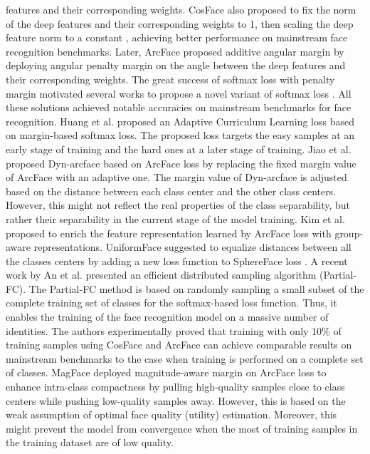 \documentclass[letterpaper, 10 pt, conference]{ieeeconf}  \usepackage{times}
\begin{document}
features and their corresponding weights. CosFace also proposed to fix the norm of the deep features and their corresponding weights to 1, then scaling the deep feature norm to a constant , achieving better performance on mainstream face recognition benchmarks. Later, ArcFace \cite{deng2019arcface}  proposed additive angular margin by deploying angular penalty margin on the angle between the deep features and their corresponding weights. The great success of softmax loss with penalty margin motivated several works to propose a novel variant of softmax loss \cite{dynarc,adaptiveface,uniformface,groupface,cricleloss,curricularface,magface,an2020partical_fc}. All these solutions achieved notable accuracies on mainstream benchmarks \cite{LFWTech,DBLP:conf/wacv/SenguptaCCPCJ16,DBLP:conf/cvpr/WhitelamTBMAMKJ17, DBLP:conf/icb/MazeADKMO0NACG18} for face recognition. 
Huang et al. \cite{curricularface} proposed an Adaptive Curriculum Learning loss based on margin-based softmax loss. The proposed loss targets the easy samples at an early stage of training and the hard ones at a later stage of training. Jiao et al. \cite{dynarc} proposed Dyn-arcface based on ArcFace loss \cite{deng2019arcface} by replacing the fixed margin value of ArcFace with an adaptive one. The margin value of Dyn-arcface is adjusted based on the distance between each class center and the other class centers. However, this might not reflect the real properties of the class separability, but rather their separability in the current stage of the model training.
Kim et al. \cite{groupface} proposed to enrich the feature representation learned by ArcFace loss with group-aware representations. UniformFace \cite{uniformface} suggested to equalize distances between all the classes centers by adding a new loss function to SphereFace loss \cite{DBLP:conf/cvpr/LiuWYLRS17}. A recent work by An et al. \cite{an2020partical_fc} presented an efficient distributed sampling algorithm (Partial-FC). 
The Partial-FC method is based on randomly sampling a small subset of the complete training set of classes for the softmax-based
loss function. Thus, it enables the training of the face recognition model on a massive number of identities. 
The authors experimentally proved that training with only 10\% of training samples using CosFace \cite{DBLP:conf/cvpr/WangWZJGZL018} and ArcFace\cite{deng2019arcface} can achieve comparable results on mainstream benchmarks to the case when training is performed on a complete set of classes.
MagFace \cite{magface} deployed magnitude-aware margin on ArcFace loss to enhance intra-class compactness by pulling high-quality
samples close to class centers while pushing low-quality samples away. However, this is based on the weak assumption of optimal face quality (utility) estimation. Moreover, this might prevent the model from convergence when the most of training samples in the training dataset are of low quality.
\end{document}
